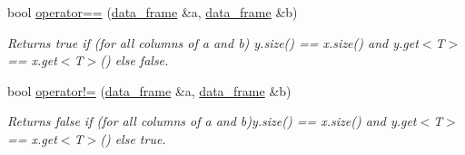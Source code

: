 \begin{DoxyCompactItemize}
bool \hyperlink{namespaceboost_1_1numeric_1_1ublas_ae71af2d81b7a1117420b6a3823e821a1}{operator==} (\hyperlink{classboost_1_1numeric_1_1ublas_1_1data__frame}{data\+\_\+frame} \&a, \hyperlink{classboost_1_1numeric_1_1ublas_1_1data__frame}{data\+\_\+frame} \&b)
\begin{DoxyCompactList}\small\item\em Returns {\ttfamily true} if (for all columns of a and b) {\ttfamily y.\+size()} == {\ttfamily x.\+size()} and {\ttfamily y.\+get$<$\+T$>$} == {\ttfamily x.\+get$<$\+T$>$()} else {\ttfamily false}. \end{DoxyCompactList}\item 
bool \hyperlink{namespaceboost_1_1numeric_1_1ublas_a1f64fd7d8ef5ad76620006b498fe8400}{operator!=} (\hyperlink{classboost_1_1numeric_1_1ublas_1_1data__frame}{data\+\_\+frame} \&a, \hyperlink{classboost_1_1numeric_1_1ublas_1_1data__frame}{data\+\_\+frame} \&b)
\begin{DoxyCompactList}\small\item\em Returns {\ttfamily false} if (for all columns of a and b){\ttfamily y.\+size()} == {\ttfamily x.\+size()} and {\ttfamily y.\+get$<$\+T$>$} == {\ttfamily x.\+get$<$\+T$>$()} else {\ttfamily true}. \end{DoxyCompactList}\end{DoxyCompactItemize}
